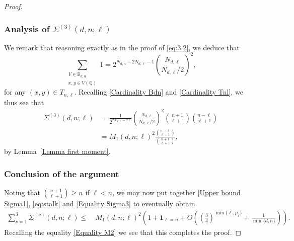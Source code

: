 \documentclass[10pt,a4paper]{amsart}
\renewcommand{\geq}{\geqslant}
\renewcommand{\leq}{\leqslant}
\begin{document}
\begin{proof}
\subsubsection*{Analysis of $\Sigma^{(3)}(d,n;\ell)$}

We remark that reasoning exactly as in the proof of  \eqref{eq:3.2}, we deduce that 
\begin{equation*}
\sum_{\substack{V \in \mathbb{B}_{d,n} \\ x, y \in V(\mathbb{Q})}} 1 = 2^{N_{d,n}-2N_{d,\ell}-1} \binom{N_{d,\ell}}{N_{d,\ell}/2}^2,
\end{equation*}
for any  $(x, y) \in T_{n,\ell}$.
Recalling  \eqref{Cardinality Bdn} and \eqref{Cardinality Tnl}, we thus see that
\begin{equation}
\label{Equality Sigma3}
\begin{split}
\Sigma^{(3)}(d,n;\ell) 
&= \frac1{2^{2N_{d,\ell}-2\ell}} \binom{N_{d,\ell}}{N_{d,\ell}/2}^2 \binom{n+1}{\ell+1} \binom{n-\ell}{\ell+1}\\
&= M_1(d,n;\ell)^2  \frac{\binom{n-\ell}{\ell+1}}{\binom{n+1}{\ell+1}},
\end{split}
\end{equation}
by Lemma~\ref{Lemma first moment}.

\subsubsection*{Conclusion of the argument}

Noting that 
$\binom{n+1}{\ell+1} \geq n$ 
if $\ell < n$, we may now put together \eqref{Upper bound Sigma1}, \eqref{eq:stalk} and \eqref{Equality Sigma3} to eventually obtain
\begin{align*}
\sum_{\nu = 1}^3 \Sigma^{(\nu)}(d,n;\ell) \leq~& M_1(d,n;\ell)^2
\left(1+ \boldsymbol{1}_{\ell=n}
+O\left(\left(\frac{3}{4}\right)^{\min\{\ell,\mu_\ell\}} +\frac{1}{\min\{d,n\}}
\right)\right).
\end{align*}
Recalling the equality \eqref{Equality M2} we see that this completes the proof. 
\end{proof}
\end{document}
